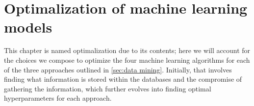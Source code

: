 \chapter{Optimalization of machine learning models}

This chapter is named optimalization due to its contents; here we will account for the choices we compose to optimize the four machine learning algorithms for each of the three approaches outlined in \autoref{sec:data mining}. Initially, that involves finding what information is stored within the databases and the compromise of gathering the information, which further evolves into finding optimal hyperparameters for each approach.

\begin{comment}
\section{Time of extraction and featurization}

The initial thought behind

\begin{table}[!ht]
\centering
\caption{}
\label{tab:timing-extraction}
\noindent\makebox[\textwidth]{
\begin{tabular}{M{3.0cm} M{4.0cm} M{4.0cm}}
  \hline
  \hline
  Database & Extraction period & Estimated time usage  \\
  \hline
  Materials Project & December $2020$ & $5$ min \\
  Citrine Informatics & December $2020$ & $2$ min  \\
  OQMD & December $2020$ & $3$ min \\
  AFLOW & January $2020$ - February $2021$ & $17$ days \\
  AFLOW-ML & January $2020$ - February $2021$ & $16$ days \\
  JARVIS-DFT & January $2020$ & $5$ min \\
  \hline
  \hline
\end{tabular}
}
\end{table}

\end{comment}
